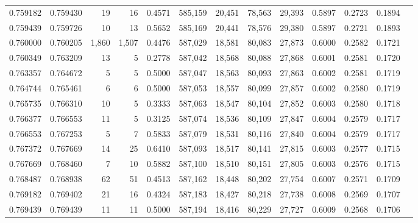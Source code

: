 \begin{tabular}{rrrrrrrrrrrrr}
0.759182 & 0.759430 &     19 &    16 &                                     0.4571 & 585,159 &  20,451 &  78,563 &  29,393 & 0.5897 & 0.2723 & 0.1894 \\
0.759439 & 0.759726 &     10 &    13 &                                     0.5652 & 585,169 &  20,441 &  78,576 &  29,380 & 0.5897 & 0.2721 & 0.1893 \\
0.760000 & 0.760205 &  1,860 & 1,507 &                                     0.4476 & 587,029 &  18,581 &  80,083 &  27,873 & 0.6000 & 0.2582 & 0.1721 \\
0.760349 & 0.763209 &     13 &     5 &                                     0.2778 & 587,042 &  18,568 &  80,088 &  27,868 & 0.6001 & 0.2581 & 0.1720 \\
0.763357 & 0.764672 &      5 &     5 &                                     0.5000 & 587,047 &  18,563 &  80,093 &  27,863 & 0.6002 & 0.2581 & 0.1719 \\
0.764744 & 0.765461 &      6 &     6 &                                     0.5000 & 587,053 &  18,557 &  80,099 &  27,857 & 0.6002 & 0.2580 & 0.1719 \\
0.765735 & 0.766310 &     10 &     5 &                                     0.3333 & 587,063 &  18,547 &  80,104 &  27,852 & 0.6003 & 0.2580 & 0.1718 \\
0.766377 & 0.766553 &     11 &     5 &                                     0.3125 & 587,074 &  18,536 &  80,109 &  27,847 & 0.6004 & 0.2579 & 0.1717 \\
0.766553 & 0.767253 &      5 &     7 &                                     0.5833 & 587,079 &  18,531 &  80,116 &  27,840 & 0.6004 & 0.2579 & 0.1717 \\
0.767372 & 0.767669 &     14 &    25 &                                     0.6410 & 587,093 &  18,517 &  80,141 &  27,815 & 0.6003 & 0.2577 & 0.1715 \\
0.767669 & 0.768460 &      7 &    10 &                                     0.5882 & 587,100 &  18,510 &  80,151 &  27,805 & 0.6003 & 0.2576 & 0.1715 \\
0.768487 & 0.768938 &     62 &    51 &                                     0.4513 & 587,162 &  18,448 &  80,202 &  27,754 & 0.6007 & 0.2571 & 0.1709 \\
0.769182 & 0.769402 &     21 &    16 &                                     0.4324 & 587,183 &  18,427 &  80,218 &  27,738 & 0.6008 & 0.2569 & 0.1707 \\
0.769439 & 0.769439 &     11 &    11 &                                     0.5000 & 587,194 &  18,416 &  80,229 &  27,727 & 0.6009 & 0.2568 & 0.1706 \\

\end{tabular}
